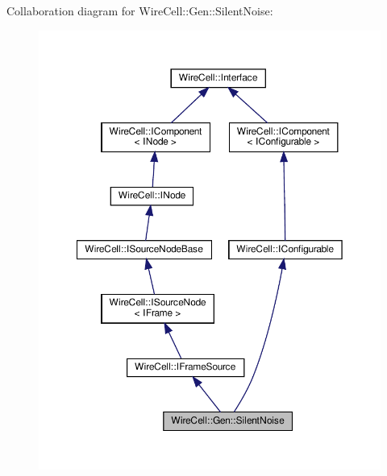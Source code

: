 Collaboration diagram for Wire\+Cell\+:\+:Gen\+:\+:Silent\+Noise\+:
\nopagebreak
\begin{figure}[H]
\begin{center}
\leavevmode
\includegraphics[width=350pt]{class_wire_cell_1_1_gen_1_1_silent_noise__coll__graph}
\end{center}
\end{figure}
